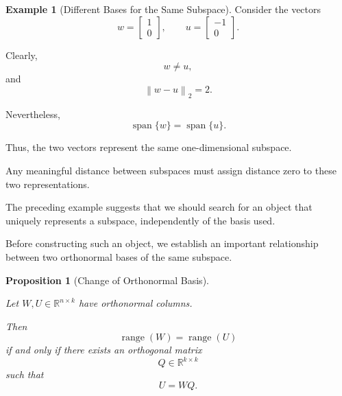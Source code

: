 \documentclass[14pt,letterpaper]{article}
\theoremstyle{plain}
\newtheorem{proposition}[theorem]{Proposition}
\theoremstyle{definition}
\newtheorem{example}[theorem]{Example}
\theoremstyle{remark}
\newcommand{\R}{\mathbb{R}}
\newcommand{\norm}[1]{\left\lVert #1 \right\rVert}
\DeclareMathOperator{\range}{range}
\DeclareMathOperator{\Span}{span}
\begin{document}
\begin{example}[Different Bases for the Same Subspace]

Consider the vectors
\[
w=
\begin{bmatrix}
1\\0
\end{bmatrix},
\qquad
u=
\begin{bmatrix}
-1\\0
\end{bmatrix}.
\]

Clearly,
\[
w\neq u,
\]
and
\[
\norm{w-u}_2=2.
\]

Nevertheless,
\[
\Span\{w\}
=
\Span\{u\}.
\]

Thus, the two vectors represent the
same one-dimensional subspace.

Any meaningful distance between subspaces
must assign distance zero to these
two representations.

\end{example}

The preceding example suggests that
we should search for an object that
uniquely represents a subspace,
independently of the basis used.

Before constructing such an object,
we establish an important relationship
between two orthonormal bases of the
same subspace.

\begin{proposition}[Change of Orthonormal Basis]
\label{prop:orthonormal_change_basis}

Let $W,U\in\R^{n\times k}$ have
orthonormal columns.

Then
\[
\range(W)=\range(U)
\]
if and only if there exists an
orthogonal matrix
\[
Q\in\R^{k\times k}
\]
such that
\[
\boxed{
U=WQ.
}
\]

\end{proposition}
\end{document}
